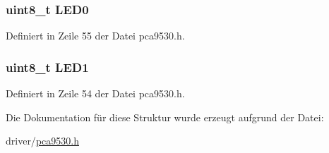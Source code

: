 \subsubsection[{L\+E\+D0}]{\setlength{\rightskip}{0pt plus 5cm}uint8\+\_\+t L\+E\+D0}\label{structpca9530__in_a698763138aab81826861fd602c87872b}


Definiert in Zeile 55 der Datei pca9530.\+h.

\hypertarget{structpca9530__in_a40e423e01a324e06ebc015b85a9d6b8e}{}
\subsubsection[{L\+E\+D1}]{\setlength{\rightskip}{0pt plus 5cm}uint8\+\_\+t L\+E\+D1}\label{structpca9530__in_a40e423e01a324e06ebc015b85a9d6b8e}


Definiert in Zeile 54 der Datei pca9530.\+h.



Die Dokumentation für diese Struktur wurde erzeugt aufgrund der Datei\+:\begin{DoxyCompactItemize}
\item 
driver/\hyperlink{pca9530_8h}{pca9530.\+h}\end{DoxyCompactItemize}

